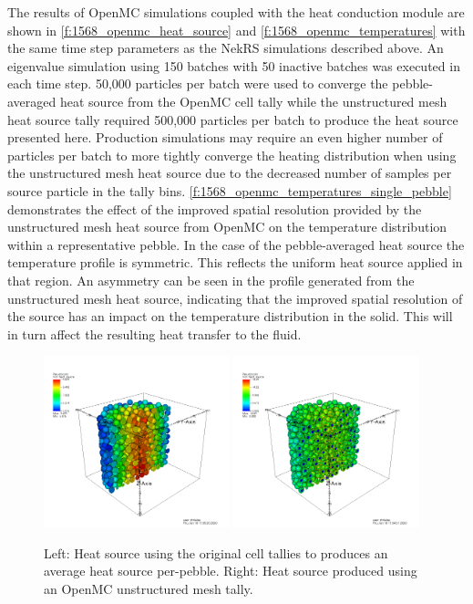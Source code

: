 The results of OpenMC simulations coupled with the heat conduction module are shown in \autoref{f:1568_openmc_heat_source} and \autoref{f:1568_openmc_temperatures} with the same time step parameters as the NekRS simulations described above.
An eigenvalue simulation using 150 batches with 50 inactive batches was executed in each time step.
50,000 particles per batch were used to converge the pebble-averaged heat source from the OpenMC cell tally while the unstructured mesh heat source tally required 500,000 particles per batch to produce the heat source presented here.
Production simulations may require an even higher number of particles per batch to more tightly converge the heating distribution when using the unstructured mesh heat source due to the decreased number of samples per source particle in the tally bins.
\autoref{f:1568_openmc_temperatures_single_pebble} demonstrates the effect of the improved spatial resolution provided by the unstructured mesh heat source from OpenMC on the temperature distribution within a representative pebble.
In the case of the pebble-averaged heat source the temperature profile is symmetric.
This reflects the uniform heat source applied in that region.
An asymmetry can be seen in the profile generated from the unstructured mesh heat source, indicating that the improved spatial resolution of the source has an impact on the temperature distribution in the solid.
This will in turn affect the resulting heat transfer to the fluid.

\begin{figure}[htb!]
\centering
\includegraphics[clip=true,width=0.48\textwidth]{Figures/openmc_cell_heat_source}
\includegraphics[clip=true,width=0.48\textwidth]{Figures/openmc_mesh_heat_source}
\caption{Left: Heat source using the original cell tallies to produces an average heat source per-pebble. Right: Heat source produced using an OpenMC unstructured mesh tally.}
\label{f:1568_openmc_heat_source}
\end{figure}

